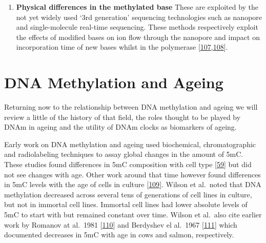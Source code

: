 \documentclass[
]{book}
\providecommand{\tightlist}{%
  \setlength{\itemsep}{0pt}\setlength{\parskip}{0pt}}
\begin{document}
\begin{enumerate}
\def\labelenumi{\arabic{enumi}.}
\setcounter{enumi}{3}
\tightlist
\item
  \textbf{Physical differences in the methylated base}
  These are exploited by the not yet widely used `3rd generation' sequencing technologies such as nanopore and single-molecule real-time sequencing.
  These methods respectively exploit the effects of modified bases on ion flow through the nanopore and impact on incorporation time of new bases whilst in the polymerase {[}\protect\hyperlink{ref-Rhoads2015}{107},\protect\hyperlink{ref-Simpson2017}{108}{]}.
\end{enumerate}

\hypertarget{dna-methylation-and-ageing}{%
\section{DNA Methylation and Ageing}\label{dna-methylation-and-ageing}}

Returning now to the relationship between DNA methylation and ageing we will review a little of the history of that field, the roles thought to be played by DNAm in ageing and the utility of DNAm clocks as biomarkers of ageing.

Early work on DNA methylation and ageing used biochemical, chromatographic and radiolabeling techniques to assay global changes in the amount of 5mC.
These studies found differences in 5mC composition with cell type {[}\protect\hyperlink{ref-Ehrlich1982}{59}{]} but did not see changes with age.
Other work around that time however found differences in 5mC levels with the age of cells in culture {[}\protect\hyperlink{ref-Wilson1983}{109}{]}.
Wilson et al.~noted that DNA methylation decreased across several tens of generations of cell lines in culture, but not in immortal cell lines.
Immortal cell lines had lower absolute levels of 5mC to start with but remained constant over time.
Wilson et al.~also cite earlier work by Romanov at al.~1981 {[}\protect\hyperlink{ref-Romanov1981}{110}{]} and Berdyshev el al.~1967 {[}\protect\hyperlink{ref-Berdyshev1967}{111}{]} which documented decreases in 5mC with age in cows and salmon, respectively.
\end{document}
